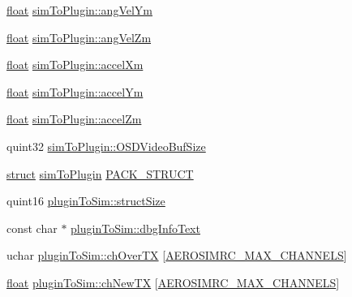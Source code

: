 \begin{DoxyCompactItemize}
\item 
\hyperlink{_super_l_u_support_8h_a6a1bb6ed41f44b60e7bd83b0e9945aa7}{float} \hyperlink{group___aero_sim_r_c_ga1cdf55eb78da8c312e32d9d5be75afef}{sim\-To\-Plugin\-::ang\-Vel\-Ym}
\item 
\hyperlink{_super_l_u_support_8h_a6a1bb6ed41f44b60e7bd83b0e9945aa7}{float} \hyperlink{group___aero_sim_r_c_ga4387cb264fd400cd98815e6145b8114c}{sim\-To\-Plugin\-::ang\-Vel\-Zm}
\item 
\hyperlink{_super_l_u_support_8h_a6a1bb6ed41f44b60e7bd83b0e9945aa7}{float} \hyperlink{group___aero_sim_r_c_ga8e87f9c4846725309216b66cf48a4fdd}{sim\-To\-Plugin\-::accel\-Xm}
\item 
\hyperlink{_super_l_u_support_8h_a6a1bb6ed41f44b60e7bd83b0e9945aa7}{float} \hyperlink{group___aero_sim_r_c_gafb442cc82353fedd9b1a4b1f841a780a}{sim\-To\-Plugin\-::accel\-Ym}
\item 
\hyperlink{_super_l_u_support_8h_a6a1bb6ed41f44b60e7bd83b0e9945aa7}{float} \hyperlink{group___aero_sim_r_c_ga15b5242cd24b1253d8fa5a12d07e3b76}{sim\-To\-Plugin\-::accel\-Zm}
\item 
quint32 \hyperlink{group___aero_sim_r_c_ga9c59c8c051c445f8f8b17ed8b42a2820}{sim\-To\-Plugin\-::\-O\-S\-D\-Video\-Buf\-Size}
\item 
\hyperlink{sdlgamepad_8dox_aba655c5729da86df745f0c8e7f9ba8d2}{struct} \hyperlink{structsim_to_plugin}{sim\-To\-Plugin} \hyperlink{group___aero_sim_r_c_gacc1a47760066283f765895e6100c5d81}{P\-A\-C\-K\-\_\-\-S\-T\-R\-U\-C\-T}
\item 
quint16 \hyperlink{group___aero_sim_r_c_ga785b39329b27020e1525b4999a10d230}{plugin\-To\-Sim\-::struct\-Size}
\item 
const char $\ast$ \hyperlink{group___aero_sim_r_c_ga8d1dec1f6592d85b15941b3ce658f44a}{plugin\-To\-Sim\-::dbg\-Info\-Text}
\item 
uchar \hyperlink{group___aero_sim_r_c_ga77e9265e0ad99dcc6a7c5cc35da0481d}{plugin\-To\-Sim\-::ch\-Over\-T\-X} \mbox{[}\hyperlink{group___aero_sim_r_c_ga63f989ac10cdcbfefadc5e65055d3c7d}{A\-E\-R\-O\-S\-I\-M\-R\-C\-\_\-\-M\-A\-X\-\_\-\-C\-H\-A\-N\-N\-E\-L\-S}\mbox{]}
\item 
\hyperlink{_super_l_u_support_8h_a6a1bb6ed41f44b60e7bd83b0e9945aa7}{float} \hyperlink{group___aero_sim_r_c_ga69be322d9251f2d0881402e3bb8b79cc}{plugin\-To\-Sim\-::ch\-New\-T\-X} \mbox{[}\hyperlink{group___aero_sim_r_c_ga63f989ac10cdcbfefadc5e65055d3c7d}{A\-E\-R\-O\-S\-I\-M\-R\-C\-\_\-\-M\-A\-X\-\_\-\-C\-H\-A\-N\-N\-E\-L\-S}\mbox{]}
\item 

\end{DoxyCompactItemize}
